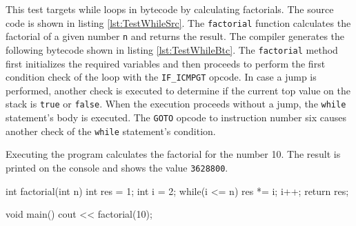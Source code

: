 This test targets while loops in bytecode by calculating factorials. The source code is shown in listing \ref{lst:TestWhileSrc}. The \verb|factorial| function calculates the factorial of a given number \verb|n| and returns the result. The compiler generates the following bytecode shown in listing \ref{lst:TestWhileBtc}. The \verb|factorial| method first initializes the required variables and then proceeds to perform the first condition check of the loop with the \verb|IF_ICMPGT| opcode. In case a jump is performed, another check is executed to determine if the current top value on the stack is \verb|true| or \verb|false|. When the execution proceeds without a jump, the \verb|while| statement's body is executed. The \verb|GOTO| opcode to instruction number six causes another check of the \verb|while| statement's condition. 


Executing the program calculates the factorial for the number 10. The result is printed on the console and shows the value \verb|3628800|. 

\begin{CppCode}[float,numbers=none,caption=MiniC\texttt{++} source code to calculate factorial with a \texttt{while} loop., label=lst:TestWhileSrc]
  int factorial(int n)
  {
    int res = 1;
    int i = 2;
    while(i <= n)
    {
       res *= i;
       i++;
    }       
      return res;
  }
  
  void main() {
    cout << factorial(10);
  }
  \end{CppCode}

    

